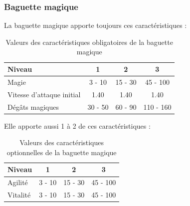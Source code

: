 \documentclass[11pt, a4paper, oneside]{report}
\begin{document}
\subsubsection{Baguette magique}
La baguette magique apporte toujours ces caractéristiques :
\begin{table}[H]
\begin{center}
\begin{tabular}{| l | c | c | c |}
  \hline      
  Niveau 				& 1 & 2 & 3\\ \hline \hline
  Magie 				& 3 - 10 & 15 - 30 & 45 - 100\\ \hline
  Vitesse d'attaque initial	& 1.40 & 1.40 & 1.40\\ \hline
  Dégâts magiques 		& 30 - 50 & 60 - 90 & 110 - 160\\ \hline
\end{tabular}
\caption{Valeurs des caractéristiques obligatoires de la baguette magique}
\end{center}
\end{table}
Elle apporte aussi 1 à 2 de ces caractéristiques :
\begin{table}[H]
\begin{center}
\begin{tabular}{| l | c | c | c |}
  \hline      
  Niveau 				& 1 & 2 & 3\\ \hline \hline
  Agilité 				& 3 - 10 & 15 - 30 & 45 - 100\\ \hline
  Vitalité 				& 3 - 10 & 15 - 30 & 45 - 100\\ \hline
\end{tabular}
\caption{Valeurs des caractéristiques optionnelles de la baguette magique}
\end{center}
\end{table}
\end{document}
